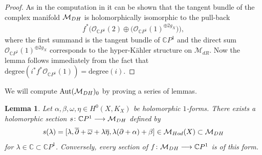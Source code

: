 \documentclass[11pt]{article}
\numberwithin{equation}{section}
\newtheorem{Lemma}[Theorem]{Lemma}
\begin{document}
\begin{proof} As in the computation in \cite[pp.~555--556]{HKLR} it can be shown that the tangent bundle of the complex manifold ${\mathcal M}_{\rm DH}$ is holomorphically isomorphic to the pull-back
\begin{gather*}f^*\big({\mathcal O}_{{\mathbb C}P^1}(2)\oplus \big({\mathcal O}_{{\mathbb C}P^1}(1)^{\oplus 2g_X}\big)\big) ,\end{gather*}
where the f\/irst summand is the tangent bundle of $\mathbb CP^1$ and the direct sum ${\mathcal O}_{{\mathbb C}P^1}(1)^{\oplus 2g_X}$ corresponds to the hyper-K\"ahler structure on $\mathcal M_{dR}$. Now the lemma follows immediately from the fact that $\text{degree}(i^*f^*{\mathcal O}_{{\mathbb
C}P^1}(1)) = \text{degree}(i)$.
\end{proof}

We will compute $\operatorname{Aut}(\mathcal M_{\rm DH})_0$ by proving a series of lemmas.
\begin{Lemma}\label{sections}
Let $\alpha, \beta, \omega, \eta \in H^0(X, K_X)$ be holomorphic $1$-forms. There exists a holomorphic section $s \colon {\mathbb C}P^1 \longrightarrow {\mathcal M}_{\rm DH}$ defined by
\begin{gather*}s(\lambda) = [\lambda, \overline{\partial}+\overline{\omega}+\lambda\overline{\eta}, \lambda(\partial+\alpha)+\beta] \in \mathcal M_{\rm Hod}(X)
 \subset {\mathcal M}_{\rm DH}\end{gather*}
for $\lambda \in {\mathbb C} \subset \mathbb CP^1$. Conversely, every section of $f \colon {\mathcal M}_{\rm DH} \longrightarrow {\mathbb C}P^1 $ is of this form.
\end{Lemma}
\end{document}
